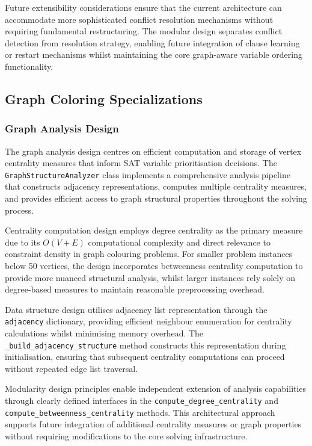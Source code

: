 Future extensibility considerations ensure that the current architecture can accommodate more sophisticated conflict resolution mechanisms without requiring fundamental restructuring. The modular design separates conflict detection from resolution strategy, enabling future integration of clause learning or restart mechanisms whilst maintaining the core graph-aware variable ordering functionality.

\subsection{Graph Coloring Specializations}

\subsubsection{Graph Analysis Design}

The graph analysis design centres on efficient computation and storage of vertex centrality measures that inform SAT variable prioritisation decisions. The \texttt{Graph\-Structure\-Analyzer} class implements a comprehensive analysis pipeline that constructs adjacency representations, computes multiple centrality measures, and provides efficient access to graph structural properties throughout the solving process.

Centrality computation design employs degree centrality as the primary measure due to its $O(V+E)$ computational complexity and direct relevance to constraint density in graph colouring problems. For smaller problem instances below 50 vertices, the design incorporates betweenness centrality computation to provide more nuanced structural analysis, whilst larger instances rely solely on degree-based measures to maintain reasonable preprocessing overhead.

Data structure design utilises adjacency list representation through the \texttt{adjacency} dictionary, providing efficient neighbour enumeration for centrality calculations whilst minimising memory overhead. The \texttt{\_build\_adjacency\_structure} method constructs this representation during initialisation, ensuring that subsequent centrality computations can proceed without repeated edge list traversal.

Modularity design principles enable independent extension of analysis capabilities through clearly defined interfaces in the \texttt{compute\_degree\_centrality} and \texttt{compute\_\-betweenness\_\-centrality} methods. This architectural approach supports future integration of additional centrality measures or graph properties without requiring modifications to the core solving infrastructure.

